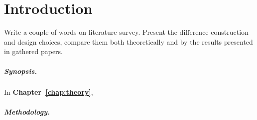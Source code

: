 \documentclass[11pt,a4paper,twoside,openany]{report}
\begin{document}
    
    \begin{titlepage}
        
    \end{titlepage}

    \newpage\blankpage

    






    \tableofcontents

    \chapter*{Introduction}
    \label{chap:introduction}
    
    Write a couple of words on literature survey. Present the difference construction and design choices, compare them both theoretically and by the results presented in gathered papers.
    \\
    \cite{rud-shpachenko:polarizers-on-sections-of-square-waveguides-with-inner-corner-ridges}

    \lipsum[1-2]

    \paragraph*{Synopsis.} In \textbf{Chapter~\ref{chap:theory}}, \lipsum[3]

    \paragraph*{Methodology.} \lipsum[4]
\end{document}

